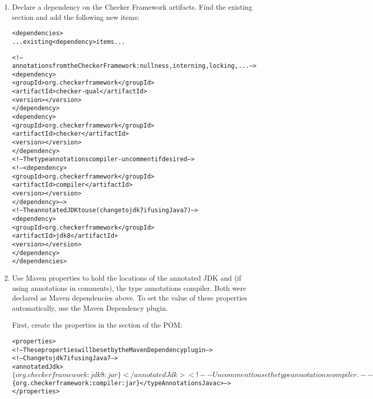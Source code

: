 \begin{enumerate}

\item Declare a dependency on the Checker Framework artifacts.  Find the
  existing  section and add the following new
   items:

\begin{alltt}
    <dependencies>
        ... existing <dependency> items ...

        <!-- annotations from the Checker Framework: nullness, interning, locking, ... -->
        <dependency>
            <groupId>org.checkerframework</groupId>
            <artifactId>checker-qual</artifactId>
            <version>\ReleaseVersion{}</version>
        </dependency>
        <dependency>
            <groupId>org.checkerframework</groupId>
            <artifactId>checker</artifactId>
            <version>\ReleaseVersion{}</version>
        </dependency>
        <!-- The type annotations compiler - uncomment if desired -->
        <!-- <dependency>
            <groupId>org.checkerframework</groupId>
            <artifactId>compiler</artifactId>
            <version>\ReleaseVersion{}</version>
        </dependency> -->
        <!-- The annotated JDK to use (change to jdk7 if using Java 7) -->
        <dependency>
            <groupId>org.checkerframework</groupId>
            <artifactId>jdk8</artifactId>
            <version>\ReleaseVersion{}</version>
        </dependency>
    </dependencies>
\end{alltt}

\item Use Maven properties to hold the locations of the
  annotated JDK and (if using annotations in comments), the type annotations compiler.  Both were declared as Maven dependencies above.
To set the value of these properties automatically, use the Maven Dependency plugin.

First, create the properties in the  section of the POM:

\begin{alltt}
<properties>
    <!-- These properties will be set by the Maven Dependency plugin -->
    <!-- Change to jdk7 if using Java 7 -->
    <annotatedJdk>$\{org.checkerframework:jdk8:jar\}</annotatedJdk>
    <!-- Uncomment to use the type annotations compiler. -->
    <!-- <typeAnnotationsJavac>$\{org.checkerframework:compiler:jar\}</typeAnnotationsJavac> -->
</properties>
\end{alltt}


\end{enumerate}

